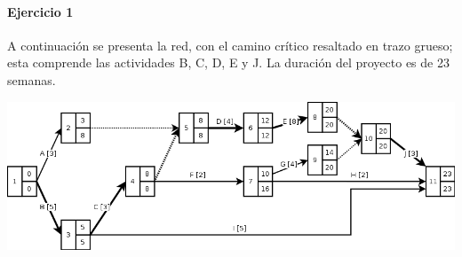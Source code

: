\documentclass[a4paper,10pt]{article}
\begin{document}
\paragraph{Ejercicio 1} A continuación se presenta la red, con el camino crítico resaltado en trazo grueso; esta comprende las actividades B, C, D, E y J. La duración del proyecto es de 23 semanas.

    \begin{center}
	\includegraphics[scale=0.55,keepaspectratio=true]{img/ej1-red.png} 
	\end{center}
  
\end{document}
